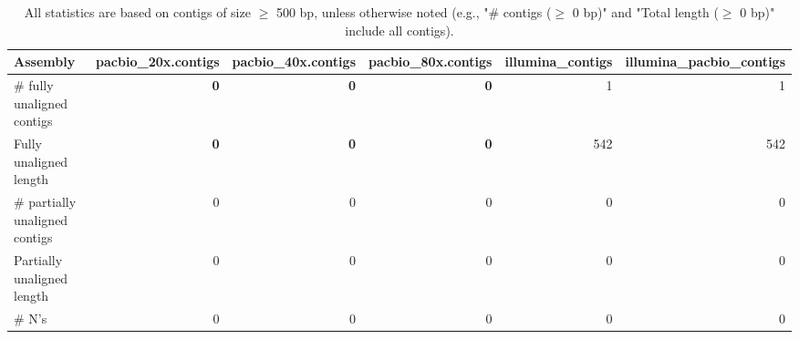 \documentclass[12pt,a4paper]{article}
\begin{document}
\begin{table}[ht]
\begin{center}
\caption{All statistics are based on contigs of size $\geq$ 500 bp, unless otherwise noted (e.g., "\# contigs ($\geq$ 0 bp)" and "Total length ($\geq$ 0 bp)" include all contigs).}
\begin{tabular}{|l*{5}{|r}|}
\hline
Assembly & pacbio\_20x.contigs & pacbio\_40x.contigs & pacbio\_80x.contigs & illumina\_contigs & illumina\_pacbio\_contigs \\ \hline
\# fully unaligned contigs & {\bf 0} & {\bf 0} & {\bf 0} & 1 & 1 \\ \hline
Fully unaligned length & {\bf 0} & {\bf 0} & {\bf 0} & 542 & 542 \\ \hline
\# partially unaligned contigs & 0 & 0 & 0 & 0 & 0 \\ \hline
Partially unaligned length & 0 & 0 & 0 & 0 & 0 \\ \hline
\# N's & 0 & 0 & 0 & 0 & 0 \\ \hline
\end{tabular}
\end{center}
\end{table}
\end{document}
